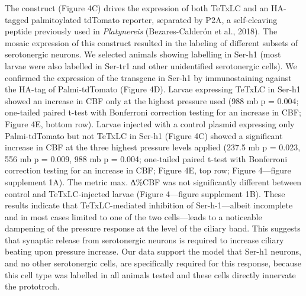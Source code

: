 \documentclass[
  11pt,
]{article}
\begin{document}
The construct (Figure 4C) drives the expression of both TeTxLC and an
HA-tagged palmitoylated tdTomato reporter, separated by P2A, a
self-cleaving peptide previously used in \emph{Platynereis}
(Bezares-Calderón et al., 2018). The mosaic expression of this construct
resulted in the labeling of different subsets of serotonergic neurons.
We selected animals showing labelling in Ser-h1 (most larvae were also
labelled in Ser-tr1 and other unidentified serotonergic cells). We
confirmed the expression of the transgene in Ser-h1 by immunostaining
against the HA-tag of Palmi-tdTomato (Figure 4D). Larvae expressing
TeTxLC in Ser-h1 showed an increase in CBF only at the highest pressure
used (988 mb p = 0.004; one-tailed paired t-test with Bonferroni
correction testing for an increase in CBF; Figure 4E, bottom row).
Larvae injected with a control plasmid expressing only Palmi-tdTomato
but not TeTxLC in Ser-h1 (Figure 4C) showed a significant increase in
CBF at the three highest pressure levels applied (237.5 mb p = 0.023,
556 mb p = 0.009, 988 mb p = 0.004; one-tailed paired t-test with
Bonferroni correction testing for an increase in CBF; Figure 4E, top
row; Figure 4---figure supplement 1A). The metric max. ∆\%CBF was not
significantly different between control and TeTxLC-injected larvae
(Figure 4---figure supplement 1B). These results indicate that
TeTxLC-mediated inhibition of Ser-h-1---albeit incomplete and in most
cases limited to one of the two cells---leads to a noticeable dampening
of the pressure response at the level of the ciliary band. This suggests
that synaptic release from serotonergic neurons is required to increase
ciliary beating upon pressure increase. Our data support the model that
Ser-h1 neurons, and no other serotonergic cells, are specifically
required for this response, because this cell type was labelled in all
animals tested and these cells directly innervate the prototroch.
\end{document}
